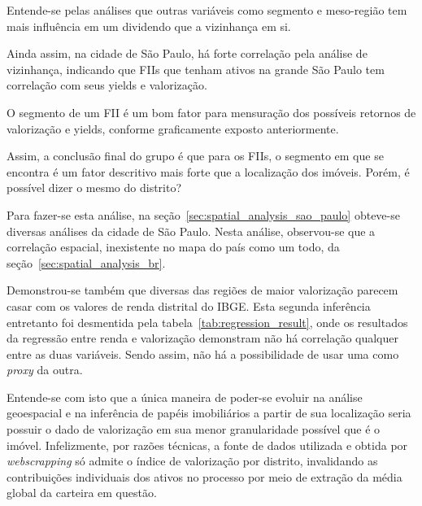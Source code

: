 \label{chap:conclusion}

Entende-se pelas análises que outras variáveis como segmento e meso-região tem mais influência em um dividendo que a vizinhança em si.

Ainda assim, na cidade de São Paulo, há forte correlação pela análise de vizinhança, indicando que FIIs que tenham ativos na grande São Paulo tem correlação com seus yields e valorização.

O segmento de um FII é um bom fator para mensuração dos possíveis retornos de valorização e yields, conforme graficamente exposto anteriormente.

Assim, a conclusão final do grupo é que para os FIIs, o segmento em que se encontra é um fator descritivo mais forte que a localização dos imóveis. Porém, é possível dizer o mesmo do distrito?

Para fazer-se esta análise, na seção~\ref{sec:spatial_analysis_sao_paulo} obteve-se diversas análises da cidade de São Paulo. Nesta análise, observou-se que a correlação espacial, inexistente no mapa do país como um todo, da seção~\ref{sec:spatial_analysis_br}. 

Demonstrou-se também que diversas das regiões de maior valorização parecem casar com os valores de renda distrital do IBGE. Esta segunda inferência entretanto foi desmentida pela tabela~\ref{tab:regression_result}, onde os resultados da regressão entre renda e valorização demonstram não há correlação qualquer entre as duas variáveis. Sendo assim, não há a possibilidade de usar uma como \emph{proxy} da outra.

Entende-se com isto que a única maneira de poder-se evoluir na análise geoespacial e na inferência de papéis imobiliários a partir de sua localização seria possuir o dado de valorização em sua menor granularidade possível que é o imóvel. Infelizmente, por razões técnicas, a fonte de dados utilizada e obtida por \emph{webscrapping} só admite o índice de valorização por distrito, invalidando as contribuições individuais dos ativos no processo por meio de extração da média global da carteira em questão. 
